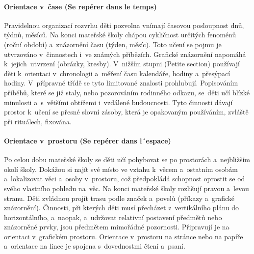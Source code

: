 			\paragraph{Orientace v čase (Se repérer dans le temps)}
				Pravidelnou organizací rozvrhu děti pozvolna vnímají časovou posloupnost dnů, týdnů, měsíců. Na konci mateřské školy chápou cykličnost určitých fenoménů (roční období) a znázornění času (týden, měsíc). Toto učení se pojmu je utvrzováno v činnostech i ve známých příbězích. Grafické znázornění napomáhá k~jejich utvrzení (obrázky, kresby).
				V nižším stupni (Petite section) používají děti k orientaci v chronologii a~měření času kalendáře, hodiny a~přesýpací hodiny. V přípravné třídě se tyto limitované znalosti prohlubují. Popisováním příběhů, které se již staly, nebo pozorováním rodinného odkazu, se děti učí blízké minulosti a~s většími obtížemi i~vzdálené budoucnosti.
				Tyto činnosti dávají prostor k učení se přesné slovní zásoby, která je opakovaným používáním, zvláště při rituálech, fixována.
			\paragraph{Orientace v prostoru (Se repérer dans l´espace)}
				Po celou dobu mateřské školy se děti učí pohybovat se po prostorách a~nejbližším okolí školy. Dokážou si najít své místo ve vztahu k věcem a~ostatním osobám a~lokalizovat věci a~osoby v~prostoru, což předpokládá schopnost oprostit se od svého vlastního pohledu na věc. Na konci mateřské školy rozlišují pravou a~levou stranu. Děti zvládnou projít trasu podle značek a~povelů (příkazy a~grafické znázornění).
				Činnosti, při kterých děti musí přecházet z vertikálního plánu do horizontálního, a~naopak, a udržovat relativní postavení předmětů nebo znázorněné prvky, jsou předmětem mimořádné pozornosti. Připravují je na orientaci v grafickém prostoru. Orientace v prostoru na stránce nebo na papíře a~orientace na lince je spojena s dovednostmi čtení a psaní. 
